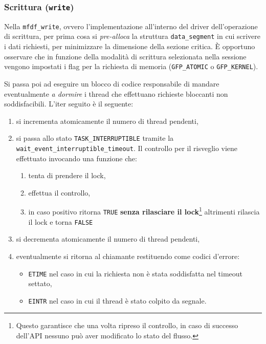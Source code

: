 \documentclass{article}
\begin{document}
\subsubsection{Scrittura (\texttt{write})}
Nella \texttt{mfdf\_write}, ovvero l'implementazione all'interno del driver dell'operazione di scrittura, per prima cosa si \textit{pre-alloca} la struttura \texttt{data\_segment} in cui scrivere i dati richiesti, per minimizzare la dimensione della sezione critica. È opportuno osservare che in funzione della modalità di scrittura selezionata nella sessione vengono impostati i flag per la richiesta di memoria (\texttt{GFP\_ATOMIC} o \texttt{GFP\_KERNEL}).

Si passa poi ad eseguire un blocco di codice responsabile di mandare eventualmente \textit{a dormire} i thread che effettuano richieste bloccanti non soddisfacibili. L'iter seguito è il seguente:
\begin{enumerate}
        \item si incrementa atomicamente il numero di thread pendenti,
        \item si passa allo stato \texttt{TASK\_INTERRUPTIBLE} tramite la \texttt{wait\_event\_interruptible\_timeout}. Il controllo per il risveglio viene effettuato invocando una funzione che:\begin{enumerate}
                \item tenta di prendere il lock,
                \item effettua il controllo,
                \item in caso positivo ritorna \texttt{TRUE} \textbf{senza rilasciare il lock}\footnote{Questo garantisce che una volta ripreso il controllo, in caso di successo dell'API nessuno può aver modificato lo stato del flusso.} altrimenti rilascia il lock e torna \texttt{FALSE}
        \end{enumerate}
        \item si decrementa atomicamente il numero di thread pendenti,
        \item eventualmente si ritorna al chiamante restituendo come codici d'errore:
                \begin{itemize}
                        \item \texttt{ETIME} nel caso in cui la richiesta non è stata soddisfatta nel timeout settato,
                        \item \texttt{EINTR} nel caso in cui il thread è stato colpito da segnale.
                \end{itemize}
\end{enumerate}
\end{document}

